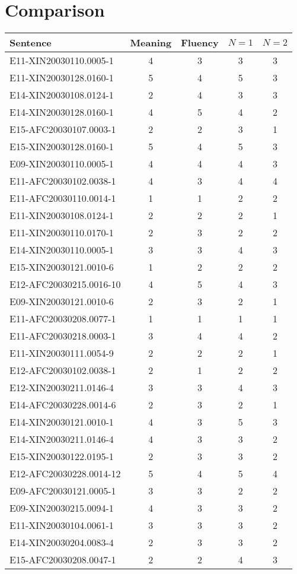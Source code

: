 \documentclass{article}
\begin{document}
\section{Comparison}

\begin{tabular}{|l|c|c|c|c|}
\hline
Sentence               & Meaning & Fluency & $N=1$ & $N=2$ \\
\hline \hline
E11-XIN20030110.0005-1 & 4 & 3 & 3 & 3 \\ \hline
E11-XIN20030128.0160-1 & 5 & 4 & 5 & 3 \\ \hline
E14-XIN20030108.0124-1 & 2 & 4 & 3 & 3 \\ \hline
E14-XIN20030128.0160-1 & 4 & 5 & 4 & 2 \\ \hline
E15-AFC20030107.0003-1 & 2 & 2 & 3 & 1 \\ \hline
E15-XIN20030128.0160-1 & 5 & 4 & 5 & 3 \\ \hline
E09-XIN20030110.0005-1 & 4 & 4 & 4 & 3 \\ \hline
E11-AFC20030102.0038-1 & 4 & 3 & 4 & 4 \\ \hline
E11-AFC20030110.0014-1 & 1 & 1 & 2 & 2 \\ \hline
E11-XIN20030108.0124-1 & 2 & 2 & 2 & 1 \\ \hline
E11-XIN20030110.0170-1 & 2 & 3 & 2 & 2 \\ \hline
E14-XIN20030110.0005-1 & 3 & 3 & 4 & 3 \\ \hline
E15-XIN20030121.0010-6 & 1 & 2 & 2 & 2 \\ \hline
E12-AFC20030215.0016-10 & 4 & 5 & 4 & 3 \\ \hline
E09-XIN20030121.0010-6 & 2 & 3 & 2 & 1 \\ \hline
E11-AFC20030208.0077-1 & 1 & 1 & 1 & 1 \\ \hline
E11-AFC20030218.0003-1 & 3 & 4 & 4 & 2 \\ \hline
E11-XIN20030111.0054-9 & 2 & 2 & 2 & 1 \\ \hline
E12-AFC20030102.0038-1 & 2 & 1 & 2 & 2 \\ \hline
E12-XIN20030211.0146-4 & 3 & 3 & 4 & 3 \\ \hline
E14-AFC20030228.0014-6 & 2 & 3 & 2 & 1 \\ \hline
E14-XIN20030121.0010-1 & 4 & 3 & 5 & 3 \\ \hline
E14-XIN20030211.0146-4 & 4 & 3 & 3 & 2 \\ \hline
E15-XIN20030122.0195-1 & 2 & 3 & 3 & 2 \\ \hline
E12-AFC20030228.0014-12 & 5 & 4 & 5 & 4 \\ \hline
E09-AFC20030121.0005-1 & 3 & 3 & 2 & 2 \\ \hline
E09-XIN20030215.0094-1 & 4 & 3 & 3 & 2 \\ \hline
E11-XIN20030104.0061-1 & 3 & 3 & 3 & 2 \\ \hline
E14-XIN20030204.0083-4 & 2 & 3 & 3 & 2 \\ \hline
E15-AFC20030208.0047-1 & 2 & 2 & 4 & 3 \\
\hline
\end{tabular}
\end{document}
